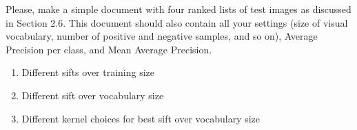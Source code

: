 \documentclass[11pt]{article}
\begin{document}
Please, make a simple document with four ranked lists of test images as discussed in Section 2.6. This document should also contain all your settings (size of visual vocabulary, number of positive and negative samples, and so on), Average Precision per class, and Mean Average Precision.

\begin{enumerate}
\item Different sifts over training size
\item Different sift over vocabulary size
\item Different kernel choices for best sift over vocabulary size
\end{enumerate}
\end{document}
